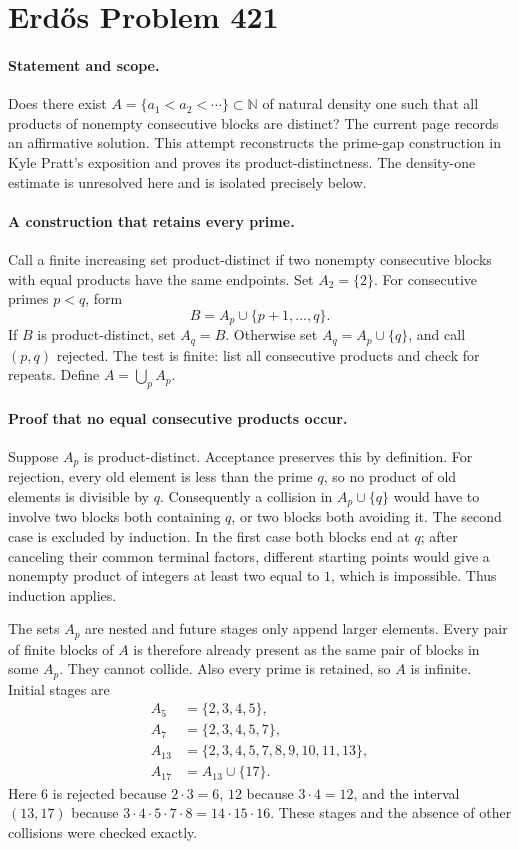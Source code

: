 \section*{Erd\H{o}s Problem 421}

\paragraph{Statement and scope.}
Does there exist \(A=\{a_1<a_2<\cdots\}\subset\mathbb N\) of natural
density one such that all products of nonempty consecutive blocks are
distinct? The current page records an affirmative solution.
This attempt reconstructs the prime-gap construction in Kyle Pratt's
exposition and proves its product-distinctness. The density-one estimate
is unresolved here and is isolated precisely below.

\paragraph{A construction that retains every prime.}
Call a finite increasing set product-distinct if two nonempty consecutive
blocks with equal products have the same endpoints. Set \(A_2=\{2\}\).
For consecutive primes \(p<q\), form
\[
 B=A_p\cup\{p+1,\ldots,q\}.
\]
If \(B\) is product-distinct, set \(A_q=B\).
Otherwise set \(A_q=A_p\cup\{q\}\), and call \((p,q)\) rejected.
The test is finite: list all consecutive products and check for repeats.
Define \(A=\bigcup_p A_p\).

\paragraph{Proof that no equal consecutive products occur.}
Suppose \(A_p\) is product-distinct. Acceptance preserves this by
definition. For rejection, every old element is less than the prime
\(q\), so no product of old elements is divisible by \(q\).
Consequently a collision in \(A_p\cup\{q\}\) would have to involve
two blocks both containing \(q\), or two blocks both avoiding it.
The second case is excluded by induction. In the first case both blocks
end at \(q\); after canceling their common terminal factors, different
starting points would give a nonempty product of integers at least
two equal to \(1\), which is impossible. Thus induction applies.

The sets \(A_p\) are nested and future stages only append larger
elements. Every pair of finite blocks of \(A\) is therefore already
present as the same pair of blocks in some \(A_p\). They cannot collide.
Also every prime is retained, so \(A\) is infinite.
Initial stages are
\[
\begin{split}
 A_5&=\{2,3,4,5\},\\
 A_7&=\{2,3,4,5,7\},\\
 A_{13}&=\{2,3,4,5,7,8,9,10,11,13\},\\
 A_{17}&=A_{13}\cup\{17\}.
\end{split}
\]
Here \(6\) is rejected because \(2\cdot3=6\), \(12\) because
\(3\cdot4=12\), and the interval \((13,17)\) because
\(3\cdot4\cdot5\cdot7\cdot8=14\cdot15\cdot16\).
These stages and the absence of other collisions were checked exactly.

